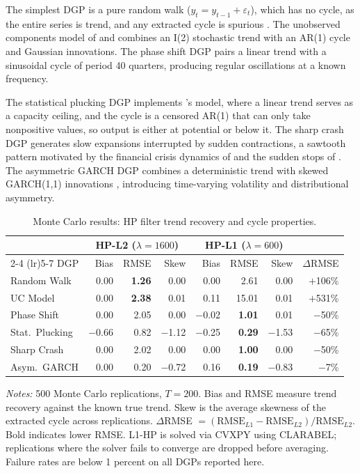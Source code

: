 \documentclass[10pt]{article}
\begin{document}
The simplest DGP is a pure random walk ($y_t = y_{t-1} + \varepsilon_t$), which has no cycle, as the entire series is trend, and any extracted cycle is spurious \citep{hamilton2018}. The unobserved components model of \citet{harvey1985} and \citet{clark1987} combines an I(2) stochastic trend with an AR(1) cycle and Gaussian innovations. The phase shift DGP pairs a linear trend with a sinusoidal cycle of period 40 quarters, producing regular oscillations at a known frequency.

The statistical plucking DGP implements \citet{friedman1964}'s model, where a linear trend serves as a capacity ceiling, and the cycle is a censored AR(1) that can only take nonpositive values, so output is either at potential or below it. The sharp crash DGP generates slow expansions interrupted by sudden contractions, a sawtooth pattern motivated by the financial crisis dynamics of \citet{reinhart_rogoff2009} and the sudden stops of \citet{calvo1998}. The asymmetric GARCH DGP combines a deterministic trend with skewed GARCH(1,1) innovations \citep{glosten_etal1993}, introducing time-varying volatility and distributional asymmetry.

\begin{table}[htbp]
\centering
\caption{Monte Carlo results: HP filter trend recovery and cycle properties.}
\label{tab:mc_results}
\begin{tabular}{l rrr rrr r}
\toprule
& \multicolumn{3}{c}{HP-L2 ($\lambda = 1600$)} & \multicolumn{3}{c}{HP-L1 ($\lambda = 600$)} & \\
\cmidrule(lr){2-4} \cmidrule(lr){5-7}
DGP & Bias & RMSE & Skew & Bias & RMSE & Skew & $\Delta$RMSE \\
\midrule
Random Walk        &    0.00 & \textbf{1.26} &    0.00 &    0.00 & 2.61 &    0.00 & $+$106\% \\
UC Model           &    0.00 & \textbf{2.38} &    0.01 &    0.11 & 15.01 &    0.01 & $+$531\% \\
Phase Shift        &    0.00 & 2.05 &    0.00 & $-$0.02 & \textbf{1.01} &    0.01 & $-$50\% \\
\midrule
Stat.\ Plucking   & $-$0.66 & 0.82 & $-$1.12 & $-$0.25 & \textbf{0.29} & $-$1.53 & $-$65\% \\
Sharp Crash        &    0.00 & 2.02 &    0.00 &    0.00 & \textbf{1.00} &    0.00 & $-$50\% \\
Asym.\ GARCH       &    0.00 & 0.20 & $-$0.72 &    0.16 & \textbf{0.19} & $-$0.83 & $-$7\%  \\
\bottomrule
\end{tabular}
\begin{tablenotes}
\small
\item \textit{Notes:} 500 Monte Carlo replications, $T = 200$. Bias and RMSE measure trend recovery against the known true trend. Skew is the average skewness of the extracted cycle across replications. $\Delta$RMSE $= (\text{RMSE}_{L1} - \text{RMSE}_{L2}) / \text{RMSE}_{L2}$. Bold indicates lower RMSE. L1-HP is solved via CVXPY using CLARABEL; replications where the solver fails to converge are dropped before averaging. Failure rates are below 1 percent on all DGPs reported here.
\end{tablenotes}
\end{table}
\end{document}
